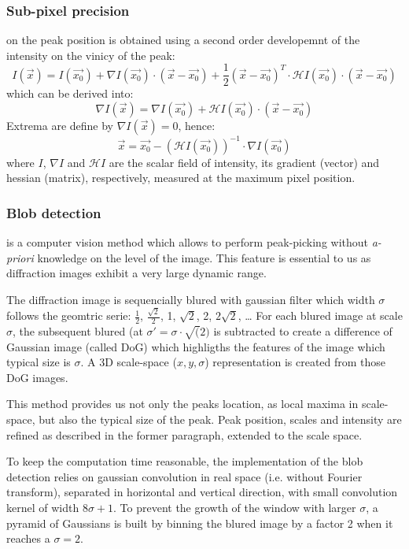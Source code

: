 \documentclass[preprint]{iucr}
\begin{document}
\subsubsection{Sub-pixel precision} 
\label{subpixel}
on the peak position is obtained using a second order developemnt of the
intensity on the vinicy of the peak:
$$ I(\overrightarrow{x}) = I(\overrightarrow{x_0}) + \nabla
I(\overrightarrow{x_0})\cdot (\overrightarrow{x}-\overrightarrow{x_0}) +
\frac{1}{2} (\overrightarrow{x}-\overrightarrow{x_0})^T\cdot\mathcal{H}
I(\overrightarrow{x_0})\cdot(\overrightarrow{x}-\overrightarrow{x_0})$$ which
can be derived into:
$$\nabla I(\overrightarrow{x}) =\nabla I(\overrightarrow{x_0}) +
\mathcal{H}I(\overrightarrow{x_0})\cdot(\overrightarrow{x}-\overrightarrow{x_0})$$
Extrema are define by $\nabla I(\overrightarrow{x})=0$, hence:
$$\overrightarrow{x} = \overrightarrow{x_0} - (\mathcal{H}
I(\overrightarrow{x_0}))^{-1}\cdot\nabla I(\overrightarrow{x_0})$$ where $I$,
$\nabla I$ and $\mathcal{H} I$ are the scalar field of intensity, its gradient
(vector) and hessian (matrix), respectively, measured at the maximum pixel position.

\subsubsection{Blob detection}
\label{blob}
is a computer vision method which allows to perform peak-picking without
\textit{a-priori} knowledge on the level of the image.
This feature is essential to us as diffraction images exhibit a very large
dynamic range.

The diffraction image is sequencially blured with gaussian filter which
width $\sigma$ follows the geomtric serie: $\frac{1}{2}$,
$\frac{\sqrt{2}}{2}$, 1, $\sqrt{2}$, 2, $2\sqrt{2}$, \ldots
For each blured image at scale $\sigma$, the subsequent blured (at
$\sigma'=\sigma\cdot\sqrt(2)$
is subtracted to create a difference of Gaussian
image (called DoG) which highligths the features of the image which typical size
is $\sigma$. 
A 3D scale-space ($x,y,\sigma$) representation is created from those DoG images.

This method provides us not only the peaks location, as local maxima in
scale-space, but also the typical size of the peak. 
Peak position, scales and intensity are refined as described in the former
paragraph, extended to the scale space.

To keep the computation time reasonable, the implementation of the blob
detection relies on gaussian convolution in real space (i.e. without Fourier
transform), separated in horizontal and vertical direction, with small
convolution kernel of width $8 \sigma +1$.
To prevent the growth of the window with larger $\sigma$, a pyramid of Gaussians
is built by binning the blured image by a factor 2 when it reaches a $\sigma=2$.
\end{document}
